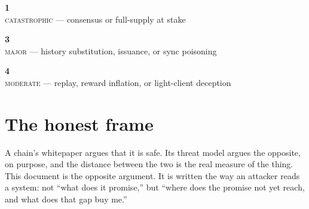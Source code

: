 \documentclass[10pt,a4paper]{article}
\begin{document}
\vspace{6pt}
\noindent
\begin{minipage}[t]{0.32\textwidth}\begin{tcolorbox}[colback=panelbg,colframe=slate,boxrule=0.5pt,arc=2pt,halign=center]
{\LARGE\bfseries\textcolor{sigilred}{1}}\\[2pt]{\scriptsize \textsc{catastrophic} — consensus or full-supply at stake}\end{tcolorbox}\end{minipage}\hfill
\begin{minipage}[t]{0.32\textwidth}\begin{tcolorbox}[colback=panelbg,colframe=slate,boxrule=0.5pt,arc=2pt,halign=center]
{\LARGE\bfseries\textcolor{sigilamber}{3}}\\[2pt]{\scriptsize \textsc{major} — history substitution, issuance, or sync poisoning}\end{tcolorbox}\end{minipage}\hfill
\begin{minipage}[t]{0.32\textwidth}\begin{tcolorbox}[colback=panelbg,colframe=slate,boxrule=0.5pt,arc=2pt,halign=center]
{\LARGE\bfseries\textcolor{sigilblue}{4}}\\[2pt]{\scriptsize \textsc{moderate} — replay, reward inflation, or light-client deception}\end{tcolorbox}\end{minipage}

\vfill
{}

\clearpage

\section{The honest frame}
\label{sec:frame}

A chain's whitepaper argues that it is safe. Its threat model argues the opposite, on
purpose, and the distance between the two is the real measure of the thing. This
document is the opposite argument. It is written the way an attacker reads a system: not
``what does it promise,'' but ``where does the promise not yet reach, and what does that
gap buy me.''
\end{document}
